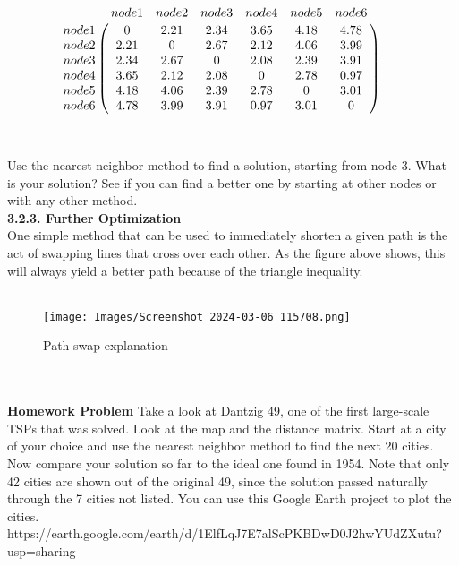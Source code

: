 \documentclass{article}
\begin{document}
\[
         \bordermatrix{ & node 1 & node 2 & node 3 & node 4 & node 5 & node 6\cr
           node 1 & 0 & 2.21 & 2.34 & 3.65 & 4.18 &                 4.78\cr
           node 2 & 2.21 & 0 & 2.67 & 2.12 & 4.06 &                 3.99\cr
           node 3 & 2.34 & 2.67 & 0 & 2.08 & 2.39 &                 3.91\cr
           node 4 & 3.65 & 2.12 & 2.08 & 0 & 2.78 &                 0.97\cr
           node 5 & 4.18 & 4.06 & 2.39 & 2.78 & 0 &                 3.01\cr
           node 6 & 4.78 & 3.99 & 3.91 & 0.97 & 3.01 &              0\cr} \qquad
     \]
\\
\\Use the nearest neighbor method to find a solution, starting from node 3. What is your solution? See if you can find a better one by starting at other nodes or with any other method.
\\
\newpage
\textbf{3.2.3. Further Optimization
\\}One simple method that can be used to immediately shorten a given path is the act of swapping lines that cross over each other. As the figure above shows, this will always yield a better path because of the triangle inequality.
\\\textbf{}
\\\begin{figure}
    \centering
    \texttt{[image: Images/Screenshot 2024-03-06 115708.png]}
    \caption{Path swap explanation}
\end{figure}
\\
\\\textbf{Homework Problem}
Take a look at Dantzig 49, one of the first large-scale TSPs that was solved. Look at the map and the distance matrix. Start at a city of your choice and use the nearest neighbor method to find the next 20 cities. Now compare your solution so far to the ideal one found in 1954. Note that only 42 cities are shown out of the original 49, since the solution passed naturally through the 7 cities not listed. You can use this Google Earth project to plot the cities. https://earth.google.com/earth/d/1ElfLqJ7E7alScPKBDwD0J2hwYUdZXutu?usp=sharing
\\
\end{document}
